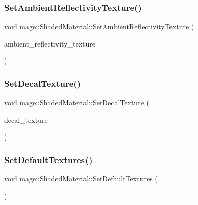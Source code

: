 \hypertarget{structmage_1_1_shaded_material_aacf12d6f3ed2b55c90366790345c6fd6}{}\label{structmage_1_1_shaded_material_aacf12d6f3ed2b55c90366790345c6fd6} 
\subsubsection{\texorpdfstring{Set\+Ambient\+Reflectivity\+Texture()}{SetAmbientReflectivityTexture()}}
{\footnotesize\ttfamily void mage\+::\+Shaded\+Material\+::\+Set\+Ambient\+Reflectivity\+Texture (\begin{DoxyParamCaption}\item[{\hyperlink{namespacemage_a1e01ae66713838a7a67d30e44c67703e}{Shared\+Ptr}$<$ \hyperlink{classmage_1_1_texture}{Texture} $>$}]{ambient\+\_\+reflectivity\+\_\+texture }\end{DoxyParamCaption})}

\hypertarget{structmage_1_1_shaded_material_a4acb72c80dfc51dacb5cba6621234685}{}\label{structmage_1_1_shaded_material_a4acb72c80dfc51dacb5cba6621234685} 
\subsubsection{\texorpdfstring{Set\+Decal\+Texture()}{SetDecalTexture()}}
{\footnotesize\ttfamily void mage\+::\+Shaded\+Material\+::\+Set\+Decal\+Texture (\begin{DoxyParamCaption}\item[{\hyperlink{namespacemage_a1e01ae66713838a7a67d30e44c67703e}{Shared\+Ptr}$<$ \hyperlink{classmage_1_1_texture}{Texture} $>$}]{decal\+\_\+texture }\end{DoxyParamCaption})}

\hypertarget{structmage_1_1_shaded_material_afbd4b9d4a2f348124c08c005a712477d}{}\label{structmage_1_1_shaded_material_afbd4b9d4a2f348124c08c005a712477d} 
\subsubsection{\texorpdfstring{Set\+Default\+Textures()}{SetDefaultTextures()}}
{\footnotesize\ttfamily void mage\+::\+Shaded\+Material\+::\+Set\+Default\+Textures (\begin{DoxyParamCaption}{ }\end{DoxyParamCaption})\hspace{0.3cm}{\ttfamily [private]}}

